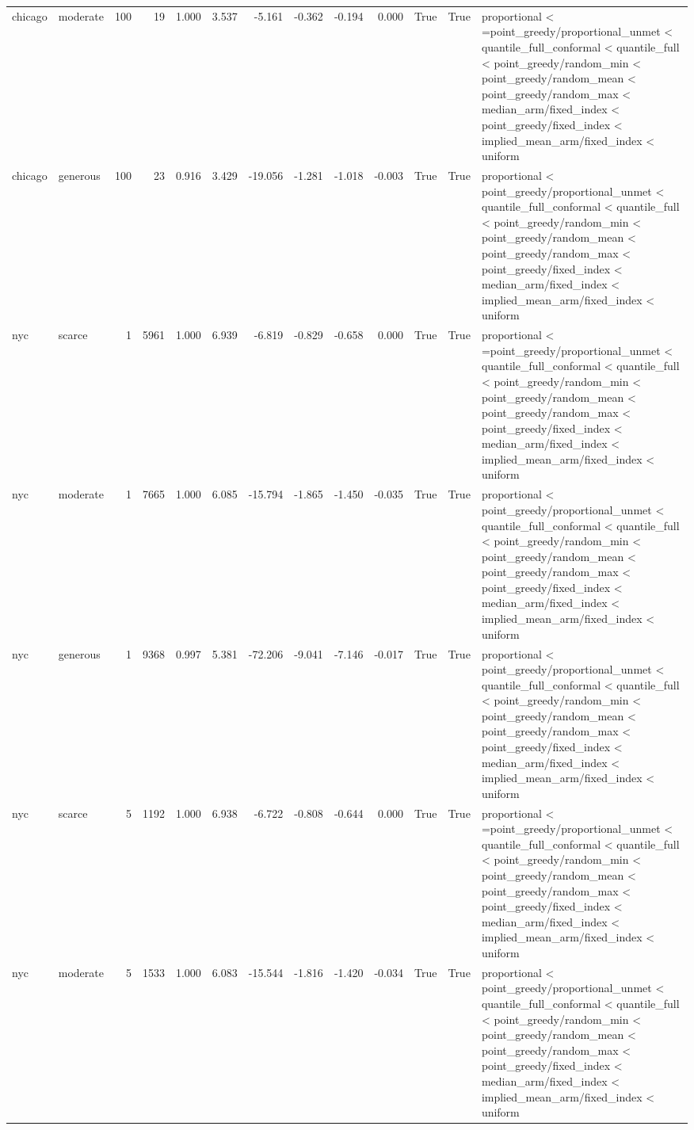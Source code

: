 \begin{tabular}{llrrrrrrrrrrl}
chicago & moderate & 100 & 19 & 1.000 & 3.537 & -5.161 & -0.362 & -0.194 & 0.000 & True & True & proportional < =point\_greedy/proportional\_unmet < quantile\_full\_conformal < quantile\_full < point\_greedy/random\_min < point\_greedy/random\_mean < point\_greedy/random\_max < median\_arm/fixed\_index < point\_greedy/fixed\_index < implied\_mean\_arm/fixed\_index < uniform \\
chicago & generous & 100 & 23 & 0.916 & 3.429 & -19.056 & -1.281 & -1.018 & -0.003 & True & True & proportional < point\_greedy/proportional\_unmet < quantile\_full\_conformal < quantile\_full < point\_greedy/random\_min < point\_greedy/random\_mean < point\_greedy/random\_max < point\_greedy/fixed\_index < median\_arm/fixed\_index < implied\_mean\_arm/fixed\_index < uniform \\
nyc & scarce & 1 & 5961 & 1.000 & 6.939 & -6.819 & -0.829 & -0.658 & 0.000 & True & True & proportional < =point\_greedy/proportional\_unmet < quantile\_full\_conformal < quantile\_full < point\_greedy/random\_min < point\_greedy/random\_mean < point\_greedy/random\_max < point\_greedy/fixed\_index < median\_arm/fixed\_index < implied\_mean\_arm/fixed\_index < uniform \\
nyc & moderate & 1 & 7665 & 1.000 & 6.085 & -15.794 & -1.865 & -1.450 & -0.035 & True & True & proportional < point\_greedy/proportional\_unmet < quantile\_full\_conformal < quantile\_full < point\_greedy/random\_min < point\_greedy/random\_mean < point\_greedy/random\_max < point\_greedy/fixed\_index < median\_arm/fixed\_index < implied\_mean\_arm/fixed\_index < uniform \\
nyc & generous & 1 & 9368 & 0.997 & 5.381 & -72.206 & -9.041 & -7.146 & -0.017 & True & True & proportional < point\_greedy/proportional\_unmet < quantile\_full\_conformal < quantile\_full < point\_greedy/random\_min < point\_greedy/random\_mean < point\_greedy/random\_max < point\_greedy/fixed\_index < median\_arm/fixed\_index < implied\_mean\_arm/fixed\_index < uniform \\
nyc & scarce & 5 & 1192 & 1.000 & 6.938 & -6.722 & -0.808 & -0.644 & 0.000 & True & True & proportional < =point\_greedy/proportional\_unmet < quantile\_full\_conformal < quantile\_full < point\_greedy/random\_min < point\_greedy/random\_mean < point\_greedy/random\_max < point\_greedy/fixed\_index < median\_arm/fixed\_index < implied\_mean\_arm/fixed\_index < uniform \\
nyc & moderate & 5 & 1533 & 1.000 & 6.083 & -15.544 & -1.816 & -1.420 & -0.034 & True & True & proportional < point\_greedy/proportional\_unmet < quantile\_full\_conformal < quantile\_full < point\_greedy/random\_min < point\_greedy/random\_mean < point\_greedy/random\_max < point\_greedy/fixed\_index < median\_arm/fixed\_index < implied\_mean\_arm/fixed\_index < uniform \\

\end{tabular}
